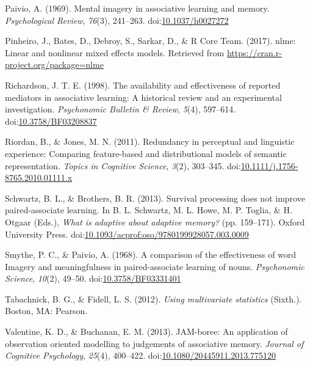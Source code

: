 \documentclass[english,,man]{apa6}
\begin{document}
\leavevmode\hypertarget{ref-Paivio1969}{}%
Paivio, A. (1969). Mental imagery in associative learning and memory. \emph{Psychological Review}, \emph{76}(3), 241--263. doi:\href{https://doi.org/10.1037/h0027272}{10.1037/h0027272}

\leavevmode\hypertarget{ref-Pinheiro2017}{}%
Pinheiro, J., Bates, D., Debroy, S., Sarkar, D., \& R Core Team. (2017). nlme: Linear and nonlinear mixed effects models. Retrieved from \url{https://cran.r-project.org/package=nlme}

\leavevmode\hypertarget{ref-Richardson1998}{}%
Richardson, J. T. E. (1998). The availability and effectiveness of reported mediators in associative learning: A historical review and an experimental investigation. \emph{Psychonomic Bulletin \& Review}, \emph{5}(4), 597--614. doi:\href{https://doi.org/10.3758/BF03208837}{10.3758/BF03208837}

\leavevmode\hypertarget{ref-Riordan2011}{}%
Riordan, B., \& Jones, M. N. (2011). Redundancy in perceptual and linguistic experience: Comparing feature-based and distributional models of semantic representation. \emph{Topics in Cognitive Science}, \emph{3}(2), 303--345. doi:\href{https://doi.org/10.1111/j.1756-8765.2010.01111.x}{10.1111/j.1756-8765.2010.01111.x}

\leavevmode\hypertarget{ref-Schwartz2013}{}%
Schwartz, B. L., \& Brothers, B. R. (2013). Survival processing does not improve paired-associate learning. In B. L. Schwartz, M. L. Howe, M. P. Toglia, \& H. Otgaar (Eds.), \emph{What is adaptive about adaptive memory?} (pp. 159--171). Oxford University Press. doi:\href{https://doi.org/10.1093/acprof:oso/9780199928057.003.0009}{10.1093/acprof:oso/9780199928057.003.0009}

\leavevmode\hypertarget{ref-Smythe1968}{}%
Smythe, P. C., \& Paivio, A. (1968). A comparison of the effectiveness of word Imagery and meaningfulness in paired-associate learning of nouns. \emph{Psychonomic Science}, \emph{10}(2), 49--50. doi:\href{https://doi.org/10.3758/BF03331401}{10.3758/BF03331401}

\leavevmode\hypertarget{ref-Tabachnick2012}{}%
Tabachnick, B. G., \& Fidell, L. S. (2012). \emph{Using multivariate statistics} (Sixth.). Boston, MA: Pearson.

\leavevmode\hypertarget{ref-Valentine2013}{}%
Valentine, K. D., \& Buchanan, E. M. (2013). JAM-boree: An application of observation oriented modelling to judgements of associative memory. \emph{Journal of Cognitive Psychology}, \emph{25}(4), 400--422. doi:\href{https://doi.org/10.1080/20445911.2013.775120}{10.1080/20445911.2013.775120}
\end{document}
